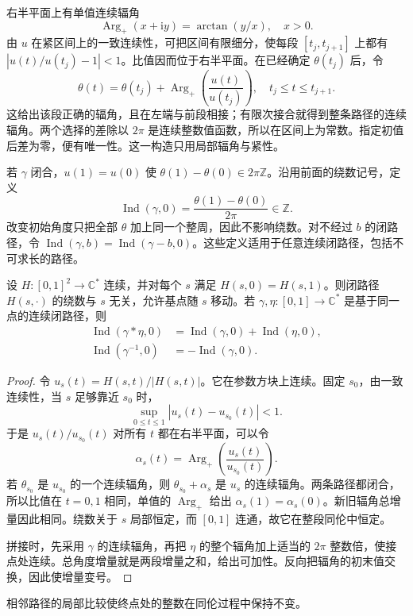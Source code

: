 \ProseParagraphBreak
右半平面上有单值连续辐角
\[
 \operatorname{Arg}_+(x+\mathrm i y)=\arctan(y/x),\quad x>0.
\]
由 \(u\) 在紧区间上的一致连续性，可把区间有限细分，使每段 \([t_j,t_{j+1}]\) 上都有 \(|u(t)/u(t_j)-1|<1\)。比值因而位于右半平面。在已经确定 \(\theta(t_j)\) 后，令
\[
 \theta(t)=\theta(t_j)+
 \operatorname{Arg}_+\left(\frac{u(t)}{u(t_j)}\right),
 \quad t_j\le t\le t_{j+1}.
\]
这给出该段正确的辐角，且在左端与前段相接；有限次接合就得到整条路径的连续辐角。两个选择的差除以 \(2\pi\) 是连续整数值函数，所以在区间上为常数。指定初值后差为零，便有唯一性。这一构造只用局部辐角与紧性。

\ProseParagraphBreak
若 \(\gamma\) 闭合，\(u(1)=u(0)\) 使 \(\theta(1)-\theta(0)\in2\pi\mathbb Z\)。沿用前面的绕数记号，定义
\[
 \operatorname{Ind}(\gamma,0)
 =\frac{\theta(1)-\theta(0)}{2\pi}\in\mathbb Z.
\]
改变初始角度只把全部 \(\theta\) 加上同一个整周，因此不影响绕数。对不经过 \(b\) 的闭路径，令 \(\operatorname{Ind}(\gamma,b)=\operatorname{Ind}(\gamma-b,0)\)。这些定义适用于任意连续闭路径，包括不可求长的路径。

\begin{proposition}\label{b3:prop:09-winding-homotopy}
设 \(H:[0,1]^2\to\mathbb C^*\) 连续，并对每个 \(s\) 满足 \(H(s,0)=H(s,1)\)。则闭路径 \(H(s,\cdot)\) 的绕数与 \(s\) 无关，允许基点随 \(s\) 移动。若 \(\gamma,\eta:[0,1]\to\mathbb C^*\) 是基于同一点的连续闭路径，则
\[
 \begin{aligned}
 \operatorname{Ind}(\gamma*\eta,0)
 &=\operatorname{Ind}(\gamma,0)+\operatorname{Ind}(\eta,0),\\
 \operatorname{Ind}(\gamma^{-1},0)&=-\operatorname{Ind}(\gamma,0).
 \end{aligned}
\]
\end{proposition}
\begin{proof}
令 \(u_s(t)=H(s,t)/|H(s,t)|\)。它在参数方块上连续。固定 \(s_0\)，由一致连续性，当 \(s\) 足够靠近 \(s_0\) 时，
\[
 \sup_{0\le t\le1}|u_s(t)-u_{s_0}(t)|<1.
\]
于是 \(u_s(t)/u_{s_0}(t)\) 对所有 \(t\) 都在右半平面，可以令
\[
 \alpha_s(t)=\operatorname{Arg}_+
 \left(\frac{u_s(t)}{u_{s_0}(t)}\right).
\]
若 \(\theta_{s_0}\) 是 \(u_{s_0}\) 的一个连续辐角，则 \(\theta_{s_0}+\alpha_s\) 是 \(u_s\) 的连续辐角。两条路径都闭合，所以比值在 \(t=0,1\) 相同，单值的 \(\operatorname{Arg}_+\) 给出 \(\alpha_s(1)=\alpha_s(0)\)。新旧辐角总增量因此相同。绕数关于 \(s\) 局部恒定，而 \([0,1]\) 连通，故它在整段同伦中恒定。

拼接时，先采用 \(\gamma\) 的连续辐角，再把 \(\eta\) 的整个辐角加上适当的 \(2\pi\) 整数倍，使接点处连续。总角度增量就是两段增量之和，给出可加性。反向把辐角的初末值交换，因此使增量变号。
\end{proof}
相邻路径的局部比较使终点处的整数在同伦过程中保持不变。

